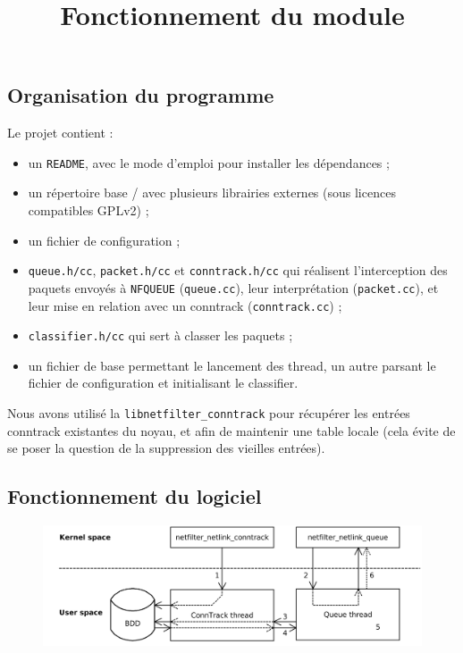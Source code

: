\subsection{Organisation du programme}
Le projet contient :
\begin{itemize}
\item un \verb+README+, avec le mode d'emploi pour installer les dépendances ;
\item un répertoire base / avec plusieurs librairies externes (sous
licences compatibles GPLv2) ;
\item un fichier de configuration ;
\item \verb+queue.h/cc+, \verb+packet.h/cc+ et \verb+conntrack.h/cc+ qui réalisent l'interception des paquets envoyés à \verb+NFQUEUE+ (\verb+queue.cc+), leur
interprétation (\verb+packet.cc+), et leur mise en relation avec un conntrack
(\verb+conntrack.cc+) ;
\item \verb+classifier.h/cc+ qui sert à classer les paquets ;
\item un fichier de base permettant le lancement des thread, un autre parsant le fichier de configuration et initialisant le classifier.
\end{itemize}

Nous avons utilisé la \verb+libnetfilter_conntrack+ pour
récupérer les entrées conntrack existantes du noyau, et afin de maintenir une table locale (cela évite de se poser la question de
la suppression des vieilles entrées).

\subsection{Fonctionnement du logiciel}

\begin{figure}[h]
\centering
\includegraphics[width=\textwidth]{schema2.png}\\
\title{Fonctionnement du module}
\end{figure}

